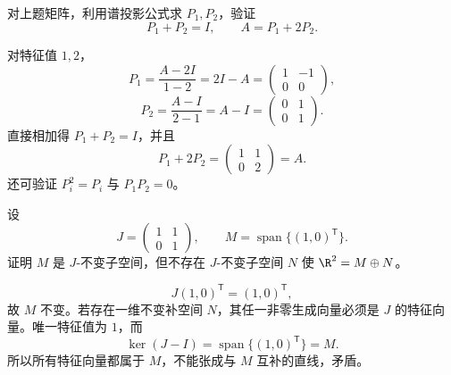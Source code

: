\begin{exercise}[level=advanced]
对上题矩阵，利用谱投影公式求 $P_1,P_2$，验证
\[
P_1+P_2=I,\qquad
A=P_1+2P_2.
\]
\begin{solution}
对特征值 $1,2$，
\[
P_1=\frac{A-2I}{1-2}=2I-A
=\begin{pmatrix}1&-1\\0&0\end{pmatrix},
\]
\[
P_2=\frac{A-I}{2-1}=A-I
=\begin{pmatrix}0&1\\0&1\end{pmatrix}.
\]
直接相加得 $P_1+P_2=I$，并且
\[
P_1+2P_2
=\begin{pmatrix}1&1\\0&2\end{pmatrix}=A.
\]
还可验证 $P_i^2=P_i$ 与 $P_1P_2=0$。
\end{solution}
\end{exercise}

\begin{exercise}[level=advanced]
设
\[
J=\begin{pmatrix}1&1\\0&1\end{pmatrix},
\qquad
M=\operatorname{span}\{(1,0)^{\mathsf T}\}.
\]
证明 $M$ 是 $J$-不变子空间，但不存在 $J$-不变子空间 $N$ 使 $\R^2=M\oplus N$。
\begin{solution}
\[
J(1,0)^{\mathsf T}=(1,0)^{\mathsf T},
\]
故 $M$ 不变。若存在一维不变补空间 $N$，其任一非零生成向量必须是 $J$ 的特征向量。唯一特征值为 $1$，而
\[
\ker(J-I)=\operatorname{span}\{(1,0)^{\mathsf T}\}=M.
\]
所以所有特征向量都属于 $M$，不能张成与 $M$ 互补的直线，矛盾。
\end{solution}
\end{exercise}

